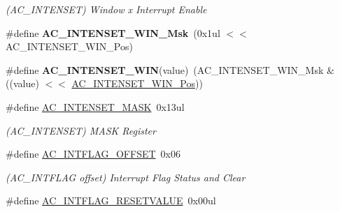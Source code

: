 \begin{DoxyCompactItemize}
\begin{DoxyCompactList}\small\item\em (A\+C\+\_\+\+I\+N\+T\+E\+N\+S\+E\+T) Window x Interrupt Enable \end{DoxyCompactList}\item 
\hypertarget{group___s_a_m_l21___a_c_ga2a01cc9b361178816f7df4bbb646cfea}{}\#define {\bfseries A\+C\+\_\+\+I\+N\+T\+E\+N\+S\+E\+T\+\_\+\+W\+I\+N\+\_\+\+Msk}~(0x1ul $<$$<$ A\+C\+\_\+\+I\+N\+T\+E\+N\+S\+E\+T\+\_\+\+W\+I\+N\+\_\+\+Pos)\label{group___s_a_m_l21___a_c_ga2a01cc9b361178816f7df4bbb646cfea}

\item 
\hypertarget{group___s_a_m_l21___a_c_gae6477ec23c78cbc904f71f2cb97d8318}{}\#define {\bfseries A\+C\+\_\+\+I\+N\+T\+E\+N\+S\+E\+T\+\_\+\+W\+I\+N}(value)~(A\+C\+\_\+\+I\+N\+T\+E\+N\+S\+E\+T\+\_\+\+W\+I\+N\+\_\+\+Msk \& ((value) $<$$<$ \hyperlink{group___s_a_m_l21___a_c_ga4e44fa65ab29f61ec05f25c67c2f8f25}{A\+C\+\_\+\+I\+N\+T\+E\+N\+S\+E\+T\+\_\+\+W\+I\+N\+\_\+\+Pos}))\label{group___s_a_m_l21___a_c_gae6477ec23c78cbc904f71f2cb97d8318}

\item 
\hypertarget{group___s_a_m_l21___a_c_ga6eb6eed878938f2a3a5dc2b0bc7c1cb7}{}\#define \hyperlink{group___s_a_m_l21___a_c_ga6eb6eed878938f2a3a5dc2b0bc7c1cb7}{A\+C\+\_\+\+I\+N\+T\+E\+N\+S\+E\+T\+\_\+\+M\+A\+S\+K}~0x13ul\label{group___s_a_m_l21___a_c_ga6eb6eed878938f2a3a5dc2b0bc7c1cb7}

\begin{DoxyCompactList}\small\item\em (A\+C\+\_\+\+I\+N\+T\+E\+N\+S\+E\+T) M\+A\+S\+K Register \end{DoxyCompactList}\item 
\hypertarget{group___s_a_m_l21___a_c_gae663a8f3156ac7555b109208126e6d66}{}\#define \hyperlink{group___s_a_m_l21___a_c_gae663a8f3156ac7555b109208126e6d66}{A\+C\+\_\+\+I\+N\+T\+F\+L\+A\+G\+\_\+\+O\+F\+F\+S\+E\+T}~0x06\label{group___s_a_m_l21___a_c_gae663a8f3156ac7555b109208126e6d66}

\begin{DoxyCompactList}\small\item\em (A\+C\+\_\+\+I\+N\+T\+F\+L\+A\+G offset) Interrupt Flag Status and Clear \end{DoxyCompactList}\item 
\hypertarget{group___s_a_m_l21___a_c_gab2b31c52d59794ebe58100c5df360881}{}\#define \hyperlink{group___s_a_m_l21___a_c_gab2b31c52d59794ebe58100c5df360881}{A\+C\+\_\+\+I\+N\+T\+F\+L\+A\+G\+\_\+\+R\+E\+S\+E\+T\+V\+A\+L\+U\+E}~0x00ul\label{group___s_a_m_l21___a_c_gab2b31c52d59794ebe58100c5df360881}


\end{DoxyCompactItemize}
